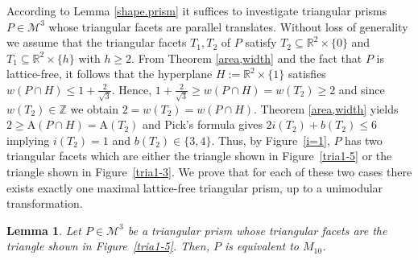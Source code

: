\documentclass[a4paper]{article}
\theoremstyle{plain}
\newtheorem{lemma}[nn]{Lemma}
\begin{document}
According to Lemma \ref{shape.prism} it suffices to
investigate triangular prisms $P \in {\mathcal{M}^3}$ whose triangular
facets are parallel translates.
Without loss of generality we assume that the triangular
facets $T_1,T_2$ of $P$ satisfy $T_2 \subseteq {\mathbb{R}}^2 \times
\{0\}$ and $T_1 \subseteq {\mathbb{R}}^2 \times \{h\}$ with $h \ge
2$.
From Theorem \ref{area,width} and the fact that $P$ is
lattice-free, it follows that the hyperplane $H := {\mathbb{R}}^2
\times\{1\}$ satisfies $w(P \cap H) \leq 1 +
\frac{2}{\sqrt{3}}$.
Hence, $1 + \frac{2}{\sqrt{3}} \geq w(P \cap H) = w(T_2)
\geq 2$ and since $w(T_2) \in {\mathbb{Z}}$ we obtain $2 = w(T_2) =
w(P \cap H)$.
Theorem \ref{area,width} yields $2 \geq {\mathrm{A}}(P \cap H) =
{\mathrm{A}}(T_2)$ and Pick's formula gives $2i(T_2) + b(T_2) \leq
6$ implying $i(T_2) = 1$ and $b(T_2) \in \{3,4\}$.
Thus, by Figure~\ref{i=1}, $P$ has two triangular facets
which are either the triangle shown in Figure~\ref{tria1-5}
or the triangle shown in Figure~\ref{tria1-3}.
We prove that for each of these two cases there exists
exactly one maximal lattice-free triangular prism, up to
a unimodular transformation.

\begin{lemma}
Let $P \in {\mathcal{M}^3}$ be a triangular prism whose triangular facets
are the triangle shown in Figure~\ref{tria1-5}. 
Then, $P$ is equivalent to $M_{10}$.
\end{lemma}
\end{document}
